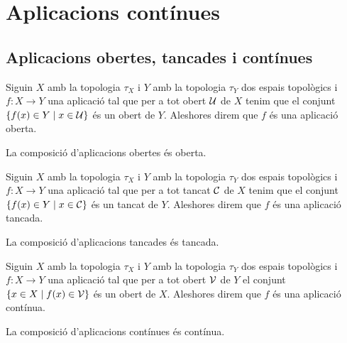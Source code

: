 \documentclass[../Apunts.tex]{subfiles}
\begin{document}
	\section{Aplicacions contínues}
	\subsection{Aplicacions obertes, tancades i contínues}
	\begin{definition}
		\label{def:aplicació oberta}
		Siguin \(X\) amb la topologia \(\tau_{X}\) i \(Y\) amb la topologia \(\tau_{Y}\) dos espais topològics i \(f\colon X\longrightarrow Y\) una aplicació tal que per a tot obert \(\mathcal{U}\) de \(X\) tenim que el conjunt \(\{f(x)\in Y\mid x\in\mathcal{U}\}\) és un obert de \(Y\). Aleshores direm que \(f\) és una aplicació oberta.
	\end{definition}
	\begin{observation}
		\label{obs:la composició d'aplicacions obertes és oberta}
		La composició d'aplicacions obertes és oberta.
	\end{observation}
	\begin{definition}
		\label{def:aplicació tancada}
		Siguin \(X\) amb la topologia \(\tau_{X}\) i \(Y\) amb la topologia \(\tau_{Y}\) dos espais topològics i \(f\colon X\longrightarrow Y\) una aplicació tal que per a tot tancat \(\mathcal{C}\) de \(X\) tenim que el conjunt \(\{f(x)\in Y\mid x\in\mathcal{C}\}\) és un tancat de \(Y\). Aleshores direm que \(f\) és una aplicació tancada.
	\end{definition}
	\begin{observation}
		\label{obs:la composició d'aplicacions tancades és tancada}
		La composició d'aplicacions tancades és tancada.
	\end{observation}
	\begin{definition}
		\label{def:aplicació contínua}
		Siguin \(X\) amb la topologia \(\tau_{X}\) i \(Y\) amb la topologia \(\tau_{Y}\) dos espais topològics i \(f\colon X\longrightarrow Y\) una aplicació tal que per a tot obert \(\mathcal{V}\) de \(Y\) el conjunt \(\{x\in X\mid f(x)\in\mathcal{V}\}\) és un obert de \(X\). Aleshores direm que \(f\) és una aplicació contínua.
	\end{definition}
	\begin{observation}
		\label{obs:la composició d'aplicacions contínues és contínua}
		La composició d'aplicacions contínues és contínua.
	\end{observation}
\end{document}
